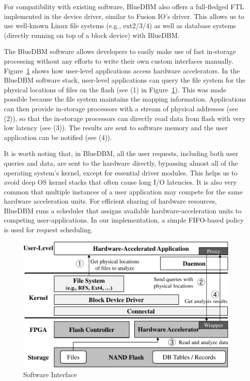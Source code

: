 For compatibility with existing software, BlueDBM also offers a full-fledged
FTL implemented in the device driver, similar to Fusion IO's driver. 
This allows us to use well-known Linux file systems (e.g.,
ext2/3/4) as well as database systems (directly running on top of a block
device) with BlueDBM.

The BlueDBM software allows developers to easily make use of fast in-storage
processing without any efforts to write their own custom interfaces manually.
Figure~\ref{fig:filesystem} shows how user-level applications access hardware
accelerators.  In the BlueDBM software stack, user-level applications can
query the file system for the physical locations of files on the flash (see (1)
in Figure~\ref{fig:filesystem}). This was made possible because the file system
maintains the mapping information.  Applications can then provide in-storage
processors with a stream of physical addresses (see (2)), so that the in-storage processors can directly read
data from flash with very low latency (see (3)).
The results are sent to software memory and the user application can be notified
(see (4)).

It is worth noting that, in BlueDBM, all the user requests, including both
user queries and data, are sent to the hardware directly, bypassing almost all
of the operating system's kernel, except for essential driver modules.  This helps us to avoid deep OS
kernel stacks that often cause long I/O latencies.  It is also very common that
multiple instances of a user application may compete for the same hardware
acceleration units. For efficient sharing of hardware resources, BlueDBM runs
a scheduler that assigns available hardware-acceleration units to competing
user-applications. In our implementation, a simple FIFO-based policy is used for
request scheduling.

\begin{figure}[h]
	\begin{center}
	\includegraphics[width=0.4\paperwidth]{figures/software.pdf}
	\caption{Software Interface}
	\label{fig:filesystem}
	\end{center}
\end{figure}
